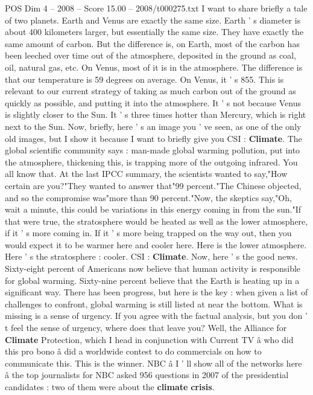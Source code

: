 \begin{textsample}{POS Dim 4 – 2008 – Score 15.00 – 2008/t000275.txt}
I want to share briefly a tale of two planets.
Earth and Venus are exactly the same size.
Earth ' s diameter is about 400 kilometers larger, but essentially the same size.
They have exactly the same amount of carbon.
But the difference is, on Earth, most of the carbon has been leeched over time out of the atmosphere, deposited in the ground as coal, oil, natural gas, etc.
On Venus, most of it is in the atmosphere.
The difference is that our temperature is 59 degrees on average.
On Venus, it ' s 855.
This is relevant to our current strategy of taking as much carbon out of the ground as quickly as possible, and putting it into the atmosphere.
It ' s not because Venus is slightly closer to the Sun.
It ' s three times hotter than Mercury, which is right next to the Sun.
Now, briefly, here ' s an image you ' ve seen, as one of the only old images, but I show it because I want to briefly give you CSI : \textbf{Climate}.
The global scientific community says : man-made global warming pollution, put into the atmosphere, thickening this, is trapping more of the outgoing infrared.
You all know that.
At the last IPCC summary, the scientists wanted to say,"How certain are you?"They wanted to answer that"99 percent."The Chinese objected, and so the compromise was"more than 90 percent."Now, the skeptics say,"Oh, wait a minute, this could be variations in this energy coming in from the sun."If that were true, the stratosphere would be heated as well as the lower atmosphere, if it ' s more coming in.
If it ' s more being trapped on the way out, then you would expect it to be warmer here and cooler here.
Here is the lower atmosphere.
Here ' s the stratosphere : cooler.
CSI : \textbf{Climate}.
Now, here ' s the good news.
Sixty-eight percent of Americans now believe that human activity is responsible for global warming.
Sixty-nine percent believe that the Earth is heating up in a significant way.
There has been progress, but here is the key : when given a list of challenges to confront, global warming is still listed at near the bottom.
What is missing is a sense of urgency.
If you agree with the factual analysis, but you don ' t feel the sense of urgency, where does that leave you?
Well, the Alliance for \textbf{Climate} Protection, which I head in conjunction with Current TV â who did this pro bono â did a worldwide contest to do commercials on how to communicate this.
This is the winner.
NBC â I ' ll show all of the networks here â the top journalists for NBC asked 956 questions in 2007 of the presidential candidates : two of them were about the \textbf{climate} \textbf{crisis}.

\end{textsample}
